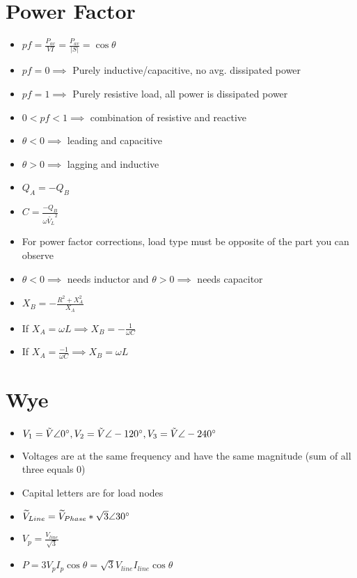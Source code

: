 \documentclass [12pt] {article}
\begin{document}
\begin{multicols*}{2}
\section{Power Factor}
	\begin{itemize}
		\item $pf = \frac{P_{av}}{VI} = \frac{P_{av}}{|S|} = \cos\theta$
		\item $pf = 0 \implies$ Purely inductive/capacitive, no avg. dissipated power 
		\item $pf = 1 \implies$ Purely resistive load, all power is dissipated power
		\item $0 < pf < 1 \implies$ combination of resistive and reactive
		\item $\theta < 0 \implies$ leading and capacitive 
		\item $\theta > 0 \implies$ lagging and inductive
		\item $Q_A = -Q_B$
		\item $C = \frac{-Q_B}{\omega\widetilde{V_L}^2}$
		\item For power factor corrections, load type must be opposite of the part you can observe 
		\item $\theta < 0 \implies$ needs inductor and $\theta > 0 \implies$ needs capacitor
		\item $X_B = -\frac{R^2 + X_A^2}{X_A}$
		\item If $X_A = \omega L \implies X_B = -\frac{1}{\omega C}$
		\item If $X_A = \frac{-1}{\omega C} \implies X_B = \omega L$
	\end{itemize}
\section{Wye}
	\begin{itemize}
		\item $V_1 = \tilde{V}\angle 0\degree, V_2 = \tilde{V}\angle -120\degree, V_3 = \tilde{V}\angle -240\degree$
		\item Voltages are at the same frequency and have the same magnitude (sum of all three equals 0)
		\item Capital letters are for load nodes
		\item $\widetilde{V}_{Line} = \widetilde{V}_{Phase}*\sqrt{3}\angle 30\degree$
		\item $V_p = \frac{V_{line}}{\sqrt{3}}$ 
		\item $P = 3V_pI_p\cos\theta = \sqrt{3}V_{line}I_{line}\cos\theta$
	\end{itemize}

\end{multicols*}
\end{document}
